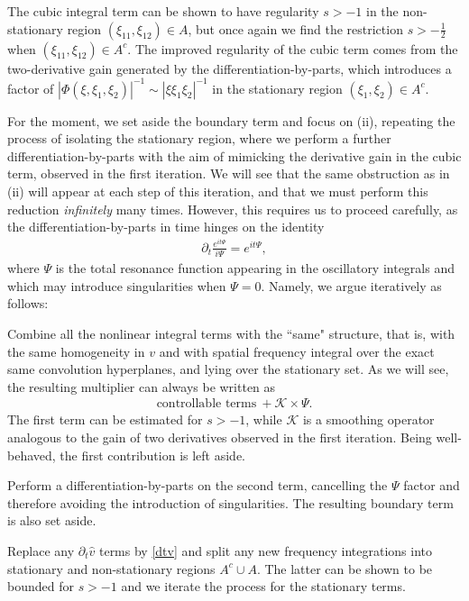\documentclass[a4paper,
11pt,  reqno]{amsart}
\newcommand{\5}{\textup{V}}
\newcommand{\noi}{\noindent}
\newcommand{\ft}{\widehat}
\newcommand{\dt}{\partial_t}
\theoremstyle{remark}
\numberwithin{equation}{section}
\numberwithin{theorem}{section}
\begin{document}
\smallskip
\noi{\rm(ii)} The cubic integral term can be shown to have regularity $s>-1$ in the non-stationary region $(\xi_{11}, \xi_{12})\in A$, but once again we find the restriction $s>-\frac12$ when $(\xi_{11}, \xi_{12})\in A^c$.
The improved regularity of the cubic term comes from the two-derivative gain generated by the differentiation-by-parts, which introduces a factor of $|\Phi(\xi,\xi_1, \xi_2)|^{-1} \sim |\xi\xi_1\xi_2|^{-1}$ in the stationary region $(\xi_1,\xi_2)\in A^c$.


\medskip

For the moment, we set aside the boundary term and focus on (ii), repeating the process of isolating the stationary region, where we perform a further differentiation-by-parts with the aim of mimicking the derivative gain in the cubic term, observed in the first iteration. We will see that the same obstruction as in (ii) will appear at each step of this iteration, and that we must perform this reduction \textit{infinitely} many times.
However, this requires us to proceed carefully, as the differentiation-by-parts in time hinges on the identity
\begin{align}
\label{exp}
\partial_t\frac{e^{it\Psi}}{i\Psi} = {e^{it\Psi}},
\end{align}
where $\Psi$ is the total resonance function appearing in the oscillatory integrals and which may introduce singularities when $\Psi=0$.
Namely, we argue iteratively as follows:



    \smallskip
\noi{\bf Step 1.}
    Combine all the nonlinear integral terms with the ``same" structure, that is,
with the same homogeneity in $v$ and with spatial frequency integral over the exact same convolution hyperplanes,  and lying over the stationary set.
As we will see, the resulting multiplier can always be written as
\begin{align}
\text{controllable terms}
\ + \mathcal{K}\times \Psi
.
\end{align}
The first term can be estimated for $s>-1$, while  $\mathcal{K}$ is a smoothing operator analogous to the gain of two derivatives observed in the first iteration. Being well-behaved, the first contribution is left aside.


    \smallskip
\noi{\bf Step 2.}
    Perform a differentiation-by-parts on the second term, cancelling the $\Psi$ factor and therefore avoiding the introduction of singularities. The resulting boundary term is also set aside.

    \smallskip
\noi{\bf Step 3.}
Replace any $\dt \ft{v}$ terms by \eqref{dtv} and split any new frequency integrations into stationary and non-stationary regions $A^c \cup A$. The latter can be shown to be bounded for $s>-1$ and we iterate the process for the stationary terms.
\end{document}
